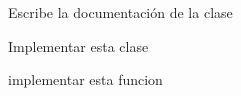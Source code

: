 
\begin{DoxyRefList}
\item[\label{todo__todo000001}%
\hypertarget{todo__todo000001}{}%
Clase \hyperlink{classfecha}{fecha} ]Escribe la documentación de la clase 

Implementar esta clase 
\item[\label{todo__todo000002}%
\hypertarget{todo__todo000002}{}%
Miembro \hyperlink{conjunto_8h_ae54b721035471d372f29c0335c42734a}{operator$<$$<$} (ostream \&sal, const conjunto \&D)]implementar esta funcion 
\end{DoxyRefList}